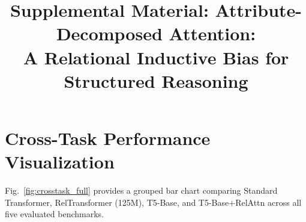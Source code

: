 \documentclass[conference]{IEEEtran}
\begin{document}
	\sloppy 

\title{Supplemental Material: Attribute-Decomposed Attention:\\A Relational Inductive Bias for Structured Reasoning}

\author{
}

\maketitle



\iffalse
\section{Cross-Task Performance Visualization}
\label{app:crosstask}

Fig.~\ref{fig:crosstask_full} provides a grouped bar chart comparing Standard Transformer, RelTransformer (125M), T5-Base, and T5-Base+RelAttn across all five evaluated benchmarks.
\end{document}
